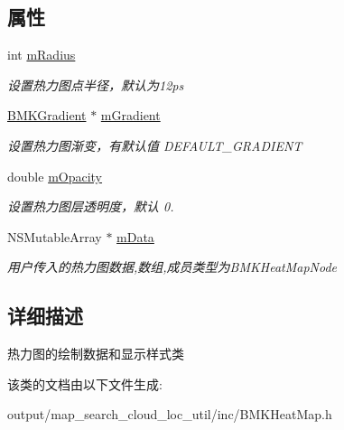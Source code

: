 \subsection*{属性}
\begin{DoxyCompactItemize}
\item 
\hypertarget{interface_b_m_k_heat_map_a3e1a824fe5eb272797ac9b39cc596519}{int \hyperlink{interface_b_m_k_heat_map_a3e1a824fe5eb272797ac9b39cc596519}{m\+Radius}}\label{interface_b_m_k_heat_map_a3e1a824fe5eb272797ac9b39cc596519}

\begin{DoxyCompactList}\small\item\em 设置热力图点半径，默认为12ps \end{DoxyCompactList}\item 
\hypertarget{interface_b_m_k_heat_map_a2457a3c31731e42bfba4d17e4c83801f}{\hyperlink{interface_b_m_k_gradient}{B\+M\+K\+Gradient} $\ast$ \hyperlink{interface_b_m_k_heat_map_a2457a3c31731e42bfba4d17e4c83801f}{m\+Gradient}}\label{interface_b_m_k_heat_map_a2457a3c31731e42bfba4d17e4c83801f}

\begin{DoxyCompactList}\small\item\em 设置热力图渐变，有默认值 D\+E\+F\+A\+U\+L\+T\+\_\+\+G\+R\+A\+D\+I\+E\+N\+T \end{DoxyCompactList}\item 
\hypertarget{interface_b_m_k_heat_map_aa012e076b6487c0670499f61e8fe807f}{double \hyperlink{interface_b_m_k_heat_map_aa012e076b6487c0670499f61e8fe807f}{m\+Opacity}}\label{interface_b_m_k_heat_map_aa012e076b6487c0670499f61e8fe807f}

\begin{DoxyCompactList}\small\item\em 设置热力图层透明度，默认 0. \end{DoxyCompactList}\item 
\hypertarget{interface_b_m_k_heat_map_aa433ebe06960ff584026d8d2d191a6fe}{N\+S\+Mutable\+Array $\ast$ \hyperlink{interface_b_m_k_heat_map_aa433ebe06960ff584026d8d2d191a6fe}{m\+Data}}\label{interface_b_m_k_heat_map_aa433ebe06960ff584026d8d2d191a6fe}

\begin{DoxyCompactList}\small\item\em 用户传入的热力图数据,数组,成员类型为\+B\+M\+K\+Heat\+Map\+Node \end{DoxyCompactList}\end{DoxyCompactItemize}


\subsection{详细描述}
热力图的绘制数据和显示样式类 

该类的文档由以下文件生成\+:\begin{DoxyCompactItemize}
\item 
output/map\+\_\+search\+\_\+cloud\+\_\+loc\+\_\+util/inc/B\+M\+K\+Heat\+Map.\+h\end{DoxyCompactItemize}
